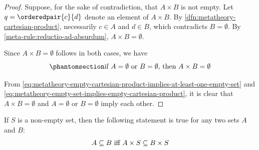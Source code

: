 \begin{proof}
    \vspace{0.1cm}
    \noindent
    Suppose, for the sake of contradiction, that \( A \times B \) is not empty.
    Let \( q = \orderedpair{c}{d} \) denote an element of \( A \times B \).
    By \cref{dfn:metatheory-cartesian-product}, necessarily \( c \in A \) and \( d \in B \), which contradicts \( B = \emptyset \).
    By \cref{meta-rule:reductio-ad-absurdum}, \( A \times B = \emptyset \).

    \vspace{0.3cm}
    \noindent
    Since \( A \times B = \emptyset \) follows in both cases, we have
    \begin{equation}
        \phantomsection \label{eq:metatheory-empty-set-implies-empty-cartesian-product}
        \text{if \( A = \emptyset \) or \( B = \emptyset \), then \( A \times B = \emptyset \)}
    \end{equation}

    \noindent
    From \eqref{eq:metatheory-empty-cartesian-product-implies-at-least-one-empty-set} and \eqref{eq:metatheory-empty-set-implies-empty-cartesian-product},
    it is clear that \( A \times B = \emptyset \) and \( A = \emptyset \) or \( B = \emptyset \) imply each other.
\end{proof}

\begin{thm}
     \label{thm:metatheory-subsets-form-cartesian-product-subsets}
    If \( S \) is a non-empty set, then the following statement is true for any two sets \( A \) and \( B \):
    \begin{equation*}
        \text{\( A \subseteq B \) iff \( A \times S \subseteq B \times S \)}
    \end{equation*}
\end{thm}

